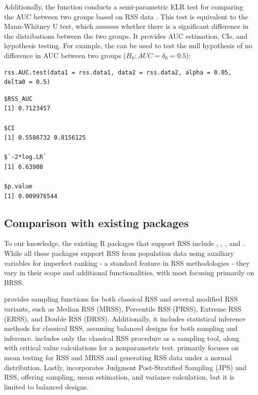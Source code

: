 Additionally, the  function conducts a semi-parametric ELR test for comparing the AUC between two groups based on RSS data \citep{Moon:2022}.  This test is equivalent to the Mann-Whitney U test, which assesses whether there is a significant difference in the distributions between the two groups. It provides AUC estimation, CIs, and hypothesis testing. For example, the  can be used to test the null hypothesis of no difference in AUC between two groups ($H_0: AUC=\delta_0=0.5$):
%
\begin{verbatim}
rss.AUC.test(data1 = rss.data1, data2 = rss.data2, alpha = 0.05, delta0 = 0.5)
\end{verbatim}
\begin{verbatim}
$RSS_AUC
[1] 0.7123457

$CI
[1] 0.5586732 0.8156125

$`-2*log.LR`
[1] 6.63908

$p.value
[1] 0.009976544
\end{verbatim}
%

\subsection{Comparison with existing packages}

To our knowledge, the existing R packages that support RSS include , , , and . While all these packages support RSS from population data using auxiliary variables for imperfect ranking - a standard feature in RSS methodologies - they vary in their scope and additional functionalities, with most focusing primarily on BRSS.

 provides sampling functions for both classical RSS and several modified RSS variants, such as Median RSS (MRSS), Percentile RSS (PRSS), Extreme RSS (ERSS), and Double RSS (DRSS). Additionally, it includes statistical inference methods for classical RSS, assuming balanced designs for both sampling and inference.  includes only the classical RSS procedure as a sampling tool, along with critical value calculations for a nonparametric test.  primarily focuses on mean testing for RSS and MRSS and generating RSS data under a normal distribution. Lastly,  incorporates Judgment Post-Stratified Sampling (JPS) and RSS, offering sampling, mean estimation, and variance calculation, but it is limited to balanced designs.

